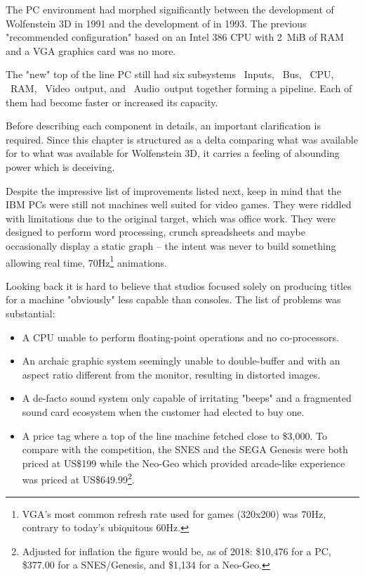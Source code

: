 The PC environment had morphed significantly between the development of Wolfenstein 3D in 1991 and the development of \doom{} in 1993. The previous "recommended configuration" based on an Intel 386 CPU with 2~MiB of RAM and a VGA graphics card was no more.\\
\par
The "new" top of the line PC still had six subsystems ~Inputs, ~Bus, ~CPU, ~RAM, ~Video~output, and ~Audio~output together forming a pipeline. Each of them had become faster or increased its capacity.\\
\par
\vspace{2mm}
\par
 Before describing each component in details, an important clarification is required. Since this chapter is structured as a delta comparing what was available for \doom{} to what was available for Wolfenstein 3D, it carries a feeling of abounding power which is deceiving. \\
 \par
 Despite the impressive list of improvements listed next, keep in mind that the IBM PCs were still not machines well suited for video games. They were riddled with limitations due to the original target, which was office work. They were designed to perform word processing, crunch spreadsheets and maybe occasionally display a static graph -- the intent was never to build something allowing real time, 70Hz\footnote{VGA's most common refresh rate used for games (320x200) was 70Hz, contrary to today's ubiquitous 60Hz.} animations.\\ 
\par 
Looking back it is hard to believe that studios focused solely on producing titles for a machine "obviously" less capable than consoles. The list of problems was substantial:
\begin{itemize}
\item A CPU unable to perform floating-point operations and no co-processors.
\item An archaic graphic system seemingly unable to double-buffer and with an aspect ratio different from the monitor, resulting in distorted images.
\item A de-facto sound system only capable of irritating "beeps" and a fragmented sound card ecosystem when the customer had elected to buy one.
\item A price tag where a top of the line machine fetched close to \$3,000. To compare with the competition, the SNES and the SEGA Genesis were both priced at US\$199 while the Neo-Geo which provided arcade-like experience was priced at US\$649.99\footnote{Adjusted for inflation the figure would be, as of 2018: \$10,476 for a PC, \$377.00 for a SNES/Genesis, and \$1,134 for a Neo-Geo.}.
\end{itemize}
